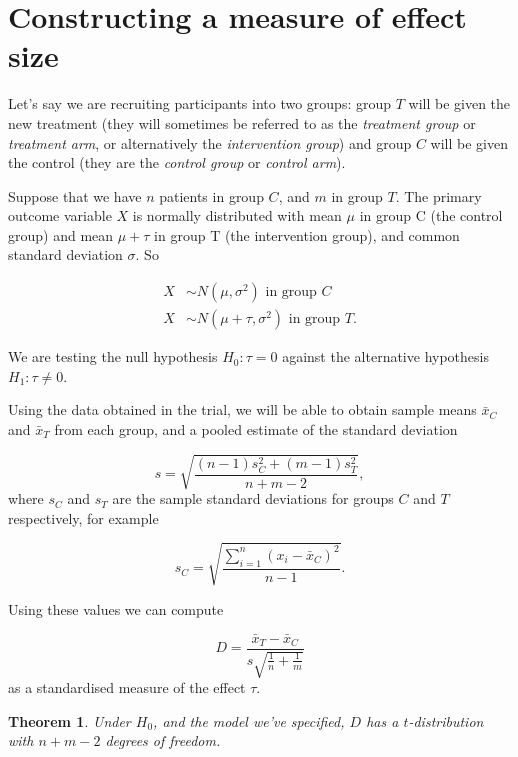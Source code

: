 \documentclass[
  openany]{book}
\newtheorem{theorem}{Theorem}[chapter]
\theoremstyle{definition}
\theoremstyle{definition}
\theoremstyle{definition}
\theoremstyle{definition}
\theoremstyle{remark}
\begin{document}
\section{Constructing a measure of effect size}\label{sec-measDcont}

Let's say we are recruiting participants into two groups: group \(T\) will be given the new treatment (they will sometimes be referred to as the \emph{treatment group} or \emph{treatment arm}, or alternatively the \emph{intervention group}) and group \(C\) will be given the control (they are the \emph{control group} or \emph{control arm}).

Suppose that we have \(n\) patients in group \(C\), and \(m\) in group \(T\). The primary outcome variable \(X\) is normally distributed with mean \(\mu\) in group C (the control group) and mean \(\mu+\tau\) in group T (the intervention group), and common standard deviation \(\sigma\). So

\begin{align*}
X & \sim N\left(\mu, \sigma^2\right) \text{ in group }C\\
X & \sim N\left(\mu + \tau, \sigma^2\right) \text{ in group }T.
\end{align*}

We are testing the null hypothesis \(H_0: \tau=0\) against the alternative hypothesis \(H_1: \tau\neq{0}\).

Using the data obtained in the trial, we will be able to obtain sample means \(\bar{x}_C\) and \(\bar{x}_T\) from each group, and a pooled estimate of the standard deviation

\[ s = \sqrt{\frac{\left(n-1\right)s_C^2 + (m-1)s_T^2}{n+m - 2}},
\]
where \(s_C\) and \(s_T\) are the sample standard deviations for groups \(C\) and \(T\) respectively, for example

\[
s_C = \sqrt{\frac{\sum\limits_{i=1}^n{\left(x_i - \bar{x}_C\right)^2}}{n-1}}.
\]

Using these values we can compute

\[D = \frac{\bar{x}_T - \bar{x}_C}{s\sqrt{\frac{1}{n} + \frac{1}{m}}}\]
as a standardised measure of the effect \(\tau\).

\begin{theorem}
Under \(H_0\), and the model we've specified, \(D\) has a \(t\)-distribution with \(n+m-2\) degrees of freedom.
\end{theorem}
\end{document}
